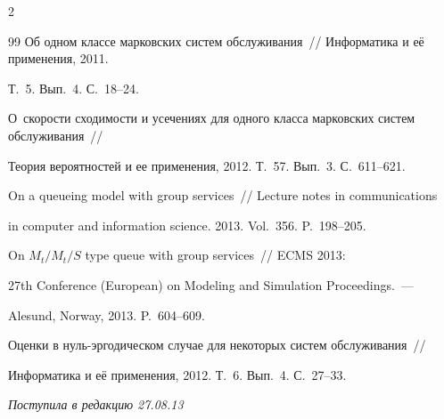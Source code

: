 \begin{multicols}{2}
{{\begin{thebibliography}{99}
Об одном классе марковских систем обслуживания~//  Информатика и её применения, 2011.

Т.~5. Вып.~4. С.~18--24.







О~ско\-рости сходимости и усечениях для одного класса марковских сис\-тем обслуживания~//

Теория вероятностей и ее применения, 2012. Т.~57. Вып.~3. С.~611--621.





On a queueing model with group services~// Lecture notes in communications

in computer and information science. 2013. Vol.~356. P.~198--205.



 



On $M_t/M_t/S$ type queue with group services~//  ECMS 2013:

27th  Conference (European) on Modeling and Simulation Proceedings.~---

Alesund, Norway, 2013. P.~604--609.



 

Оценки в нуль-эр\-го\-ди\-че\-ском случае для некоторых сис\-тем обслуживания~//

Информатика и её применения, 2012. Т.~6. Вып.~4. С.~27--33.



\end{thebibliography}

} }



\end{multicols}



\hfill{\small\textit{Поступила в редакцию 27.08.13}}






